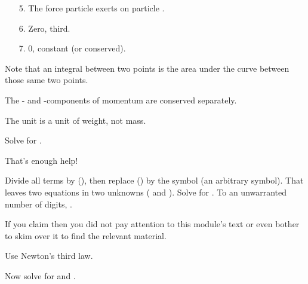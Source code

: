 {{\begin{itemize}
\item [5.] The force particle  exerts on particle .

\item [6.] Zero, third.

\item [7.] 0, constant (or conserved).
\end{itemize}
}

{Note that an integral between two points is the area under the curve
 between those same two points.
}

{The - and -components of momentum are conserved separately. 
}

{The unit  is a unit of weight, not mass.
}

{ \newline
  \newline
 Solve for \m{\theta}. 
}

{\newline
 That's enough help!
}

{Divide all terms by (), then replace () by the symbol 
 (an arbitrary symbol).
 That leaves two equations in two unknowns ( and \m{\theta}).
 Solve for \m{\theta}.
 To an unwarranted number of digits, \m{\theta = 52.5\degrees}.
}

{If you claim  then you did
 not pay attention to this module's text or even bother to skim over it
 to find the relevant material.
}

{Use Newton's third law.
}

{ \newline
  \newline
 Now solve for  and .
}

}
